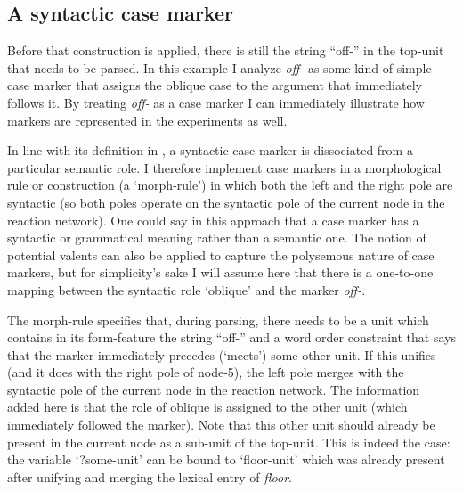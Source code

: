 \subsection{A syntactic case marker}
\label{s:morph-rule}

Before that construction is applied, there is still the string ``off-'' in the top-unit that needs to be parsed. In this example I analyze {\em off-} as some kind of simple case marker that assigns the oblique case to the argument that immediately follows it. By treating {\em off-} as a case marker I can immediately illustrate how markers are represented in the experiments as well.

In line with its definition in , a syntactic case marker is dissociated from a particular semantic role. I therefore implement case markers in a morphological rule or construction (a `morph-rule') in which both the left and the right pole are syntactic (so both poles operate on the syntactic pole of the current node in the reaction network). One could say in this approach that a case marker has a syntactic or grammatical meaning rather than a semantic one. The notion of potential valents can also be applied to capture the polysemous nature of case markers, but for simplicity's sake I will assume here that there is a one-to-one mapping between the syntactic role `oblique' and the marker {\em off-}.

The morph-rule specifies that, during parsing, there needs to be a unit which contains in its form-feature the string ``off-'' and a word order constraint that says that the marker immediately precedes (`meets') some other unit. If this unifies (and it does with the right pole of node-5), the left pole merges with the syntactic pole of the current node in the reaction network. The information added here is that the role of oblique is assigned to the other unit (which immediately followed the marker). Note that this other unit should already be present in the current node as a sub-unit of the top-unit. This is indeed the case: the variable `?some-unit' can be bound to `floor-unit' which was already present after unifying and merging the lexical entry of {\em floor}.

